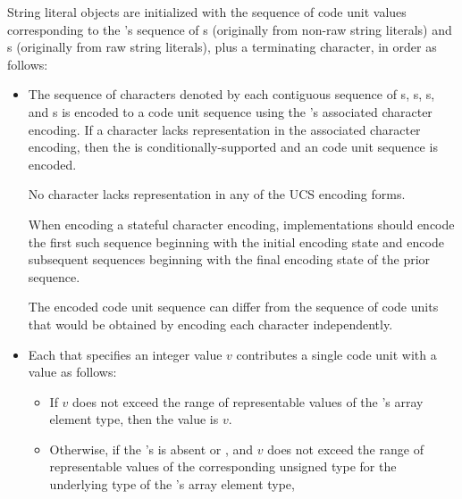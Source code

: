 \pnum
{}%
%
%
String literal objects are initialized with
the sequence of code unit values
corresponding to the 's sequence of
s (originally from non-raw string literals) and
s (originally from raw string literals),
plus a terminating  character,
in order as follows:
\begin{itemize}
\item
The sequence of characters denoted by each contiguous sequence of
s,
s,
s, and
s
is encoded to a code unit sequence
using the 's associated character encoding.
If a character lacks representation in the associated character encoding,
then the  is conditionally-supported and
an
code unit sequence is encoded.
\begin{note}
No character lacks representation in any of the UCS encoding forms.
\end{note}
When encoding a stateful character encoding,
implementations should encode the first such sequence
beginning with the initial encoding state and
encode subsequent sequences
beginning with the final encoding state of the prior sequence.
\begin{note}
The encoded code unit sequence can differ from
the sequence of code units that would be obtained by
encoding each character independently.
\end{note}
\item
Each 
that specifies an integer value $v$
contributes a single code unit with a value as follows:
\begin{itemize}
\item
If $v$ does not exceed the range of representable values of
the 's array element type,
then the value is $v$.
\item
Otherwise,
if the 's 
is absent or , and
$v$ does not exceed the range of representable values of
the corresponding unsigned type for the underlying type of
the 's array element type,

\end{itemize}
\end{itemize}
